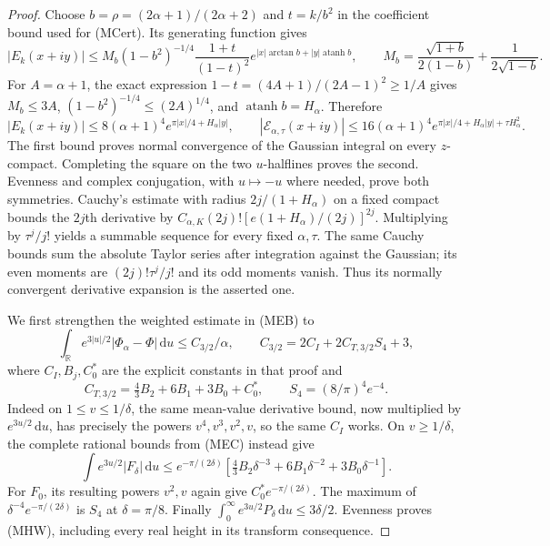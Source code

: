\documentclass[11pt]{article}
\theoremstyle{remark}\newtheorem{remark}[theorem]{Remark}
\newcommand{\R}{\mathbb R}
\newcommand{\dd}{\,\mathrm d}
\begin{document}
\begin{proof}
Choose $b=\rho=(2\alpha+1)/(2\alpha+2)$ and $t=k/b^2$ in the
coefficient bound used for (MCert). Its generating function gives
\[
 |E_k(x+iy)|\le
 M_b(1-b^2)^{-1/4}\frac{1+t}{(1-t)^2}
               e^{|x|\arctan b+|y|\operatorname{atanh}b},
 \qquad
 M_b=\frac{\sqrt{1+b}}{2(1-b)}
                  +\frac1{2\sqrt{1-b}}.
\]
For $A=\alpha+1$, the exact expression
$1-t=(4A+1)/(2A-1)^2\ge1/A$ gives
$M_b\le3A$, $(1-b^2)^{-1/4}\le(2A)^{1/4}$, and
$\operatorname{atanh}b=H_\alpha$. Therefore
\[
 |E_k(x+iy)|\le8(\alpha+1)^4
                    e^{\pi|x|/4+H_\alpha|y|},\qquad
 |\mathcal E_{\alpha,\tau}(x+iy)|\le16(\alpha+1)^4
                    e^{\pi|x|/4+H_\alpha|y|+\tau H_\alpha^2}.
 \tag{MHG}
\]
The first bound proves normal convergence of the Gaussian integral
on every $z$-compact. Completing the square on the two $u$-halflines
proves the second. Evenness and complex conjugation, with $u\mapsto-u$
where needed, prove both symmetries. Cauchy's estimate with radius
$2j/(1+H_\alpha)$ on a fixed compact bounds the $2j$th derivative by
$C_{\alpha,K}(2j)![e(1+H_\alpha)/(2j)]^{2j}$.
Multiplying by $\tau^j/j!$ yields a summable sequence for every
fixed $\alpha,\tau$. The same Cauchy bounds sum the absolute Taylor
series after integration against the Gaussian; its even moments
are $(2j)!\tau^j/j!$ and its odd moments vanish. Thus its normally
convergent derivative expansion is the asserted one.

We first strengthen the weighted estimate in (MEB) to
\[
 \int_\R e^{3|u|/2}|\Phi_\alpha-\Phi|\dd u
           \le C_{3/2}/\alpha,\qquad
 C_{3/2}=2C_I+2C_{T,3/2}S_4+3,
 \tag{MHW}
\]
where $C_I,B_j,C_0^*$ are the explicit constants in that proof and
\[
 C_{T,3/2}=\tfrac43B_2+6B_1+3B_0+C_0^*,\qquad
 S_4=(8/\pi)^4e^{-4}.
\]
Indeed on $1\le v\le1/\delta$, the same mean-value derivative bound,
now multiplied by $e^{3u/2}\dd u$, has precisely the powers
$v^4,v^3,v^2,v$, so the same $C_I$ works. On $v\ge1/\delta$,
the complete rational bounds from (MEC) instead give
\[
 \int e^{3u/2}|F_\delta|\dd u\le e^{-\pi/(2\delta)}
          [\tfrac43B_2\delta^{-3}
                         +6B_1\delta^{-2}+3B_0\delta^{-1}].
\]
For $F_0$, its resulting powers $v^2,v$ again give
$C_0^*e^{-\pi/(2\delta)}$. The maximum of
$\delta^{-4}e^{-\pi/(2\delta)}$ is $S_4$ at $\delta=\pi/8$.
Finally
$\int_0^\infty e^{3u/2}P_\delta\dd u\le3\delta/2$.
Evenness proves (MHW), including every real height in its transform
consequence.


\end{proof}
\end{document}
